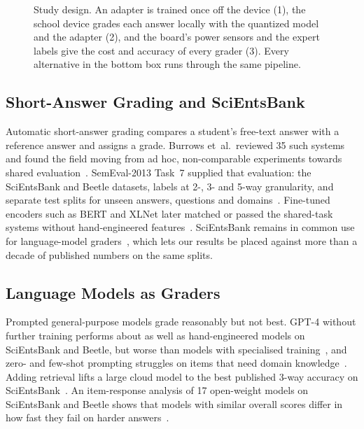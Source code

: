 \documentclass[journal]{IEEEtran}
\begin{document}
\begin{figure}[t]
\caption{Study design. An adapter is trained once off the device (1), the school device grades each answer locally with the quantized model and the adapter (2), and the board's power sensors and the expert labels give the cost and accuracy of every grader (3). Every alternative in the bottom box runs through the same pipeline.}
\label{fig:arch}
\end{figure}

\subsection{Short-Answer Grading and SciEntsBank}
Automatic short-answer grading compares a student's free-text answer with a reference answer and assigns a grade.
Burrows et~al.\ reviewed 35 such systems and found the field moving from ad hoc, non-comparable experiments towards shared evaluation~\cite{burrows2015eras}.
SemEval-2013 Task~7 supplied that evaluation: the SciEntsBank and Beetle datasets, labels at 2-, 3- and 5-way granularity, and separate test splits for unseen answers, questions and domains~\cite{dzikovska2013semeval}.
Fine-tuned encoders such as BERT and XLNet later matched or passed the shared-task systems without hand-engineered features~\cite{ghavidel2020bert}.
SciEntsBank remains in common use for language-model graders~\cite{kortemeyer2024gpt4,wang2024rag,cong2026irt}, which lets our results be placed against more than a decade of published numbers on the same splits.

\subsection{Language Models as Graders}
Prompted general-purpose models grade reasonably but not best.
GPT-4 without further training performs about as well as hand-engineered models on SciEntsBank and Beetle, but worse than models with specialised training~\cite{kortemeyer2024gpt4}, and zero- and few-shot prompting struggles on items that need domain knowledge~\cite{chamieh2024llms}.
Adding retrieval lifts a large cloud model to the best published 3-way accuracy on SciEntsBank~\cite{wang2024rag}.
An item-response analysis of 17 open-weight models on SciEntsBank and Beetle shows that models with similar overall scores differ in how fast they fail on harder answers~\cite{cong2026irt}.
\end{document}
